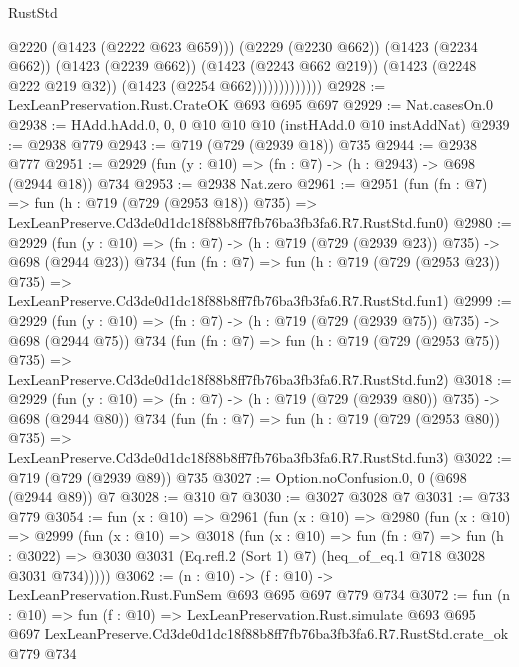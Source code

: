 \begin{lexlean}{RustStd}
\begin{coremodule}
                            @2220
                            (@1423 (@2222 @623 @659)))
                          (@2229 (@2230 @662))
                          (@1423 (@2234 @662))
                          (@1423 (@2239 @662))
                          (@1423 (@2243 @662 @219))
                          (@1423 (@2248 @222 @219 @32))
                          (@1423 (@2254 @662)))))))))))))
@2928 := LexLeanPreservation.Rust.CrateOK @693 @695 @697
@2929 := Nat.casesOn.{0}
@2938 := HAdd.hAdd.{0, 0, 0} @10 @10 @10 (instHAdd.{0} @10 instAddNat)
@2939 := @2938 @779
@2943 := @719 (@729 (@2939 @18)) @735
@2944 := @2938 @777
@2951 := @2929 (fun (y : @10) => (fn : @7) -> (h : @2943) -> @698 (@2944 @18)) @734
@2953 := @2938 Nat.zero
@2961 := @2951
    (fun (fn : @7) =>
    fun (h : @719 (@729 (@2953 @18)) @735) =>
    LexLeanPreserve.Cd3de0d1dc18f88b8ff7fb76ba3fb3fa6.R7.RustStd.fun0)
@2980 := @2929
    (fun (y : @10) => (fn : @7) -> (h : @719 (@729 (@2939 @23)) @735) -> @698 (@2944 @23))
    @734
    (fun (fn : @7) =>
    fun (h : @719 (@729 (@2953 @23)) @735) =>
    LexLeanPreserve.Cd3de0d1dc18f88b8ff7fb76ba3fb3fa6.R7.RustStd.fun1)
@2999 := @2929
    (fun (y : @10) => (fn : @7) -> (h : @719 (@729 (@2939 @75)) @735) -> @698 (@2944 @75))
    @734
    (fun (fn : @7) =>
    fun (h : @719 (@729 (@2953 @75)) @735) =>
    LexLeanPreserve.Cd3de0d1dc18f88b8ff7fb76ba3fb3fa6.R7.RustStd.fun2)
@3018 := @2929
    (fun (y : @10) => (fn : @7) -> (h : @719 (@729 (@2939 @80)) @735) -> @698 (@2944 @80))
    @734
    (fun (fn : @7) =>
    fun (h : @719 (@729 (@2953 @80)) @735) =>
    LexLeanPreserve.Cd3de0d1dc18f88b8ff7fb76ba3fb3fa6.R7.RustStd.fun3)
@3022 := @719 (@729 (@2939 @89)) @735
@3027 := Option.noConfusion.{0, 0} (@698 (@2944 @89)) @7
@3028 := @310 @7
@3030 := @3027 @3028 @7
@3031 := @733 @779
@3054 := fun (x : @10) =>
  @2961
    (fun (x : @10) =>
    @2980
      (fun (x : @10) =>
      @2999
        (fun (x : @10) =>
        @3018
          (fun (x : @10) =>
          fun (fn : @7) =>
          fun (h : @3022) =>
          @3030 @3031 (Eq.refl.{2} (Sort 1) @7) (heq_of_eq.{1} @718 @3028 @3031 @734)))))
@3062 := (n : @10) -> (f : @10) -> LexLeanPreservation.Rust.FunSem @693 @695 @697 @779 @734
@3072 := fun (n : @10) =>
  fun (f : @10) =>
  LexLeanPreservation.Rust.simulate
    @693
    @695
    @697
    LexLeanPreserve.Cd3de0d1dc18f88b8ff7fb76ba3fb3fa6.R7.RustStd.crate_ok
    @779
    @734
\end{coremodule}
\end{lexlean}
